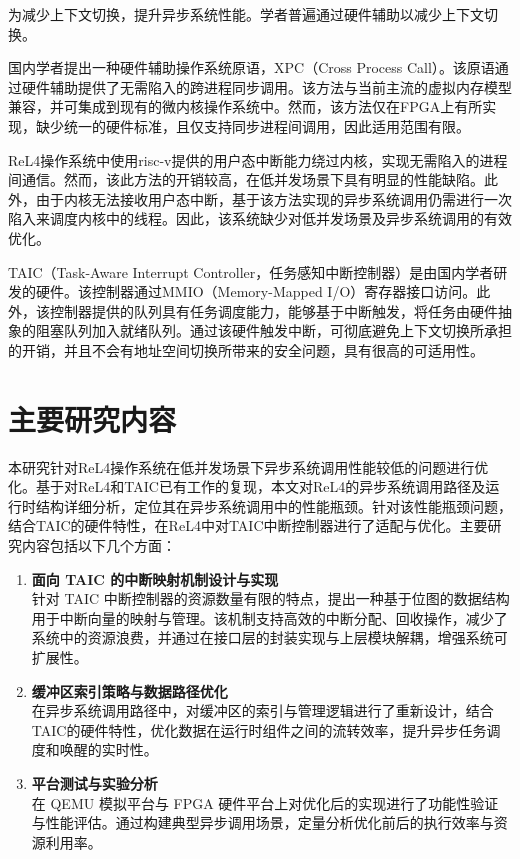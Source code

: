为减少上下文切换，提升异步系统性能。学者普遍通过硬件辅助以减少上下文切换。

国内学者提出一种硬件辅助操作系统原语，XPC（Cross Process Call）\cite{XPC2019}。该原语通过硬件辅助提供了无需陷入的跨进程同步调用。该方法与当前主流的虚拟内存模型兼容，并可集成到现有的微内核操作系统中。然而，该方法仅在FPGA上有所实现，缺少统一的硬件标准，且仅支持同步进程间调用，因此适用范围有限。

ReL4操作系统中使用risc-v提供的用户态中断能力绕过内核，实现无需陷入的进程间通信。然而，该此方法的开销较高，在低并发场景下具有明显的性能缺陷。此外，由于内核无法接收用户态中断，基于该方法实现的异步系统调用仍需进行一次陷入来调度内核中的线程。因此，该系统缺少对低并发场景及异步系统调用的有效优化。

TAIC（Task-Aware Interrupt Controller，任务感知中断控制器）\cite{taic2024}是由国内学者研发的硬件。该控制器通过MMIO（Memory-Mapped I/O）寄存器接口访问。此外，该控制器提供的队列具有任务调度能力，能够基于中断触发，将任务由硬件抽象的阻塞队列加入就绪队列。通过该硬件触发中断，可彻底避免上下文切换所承担的开销，并且不会有地址空间切换所带来的安全问题，具有很高的可适用性。

\section{主要研究内容}

本研究针对ReL4操作系统在低并发场景下异步系统调用性能较低的问题进行优化。基于对ReL4和TAIC已有工作的复现，本文对ReL4的异步系统调用路径及运行时结构详细分析，定位其在异步系统调用中的性能瓶颈。针对该性能瓶颈问题，结合TAIC的硬件特性，在ReL4中对TAIC中断控制器进行了适配与优化。主要研究内容包括以下几个方面：

\begin{enumerate}

  \item \textbf{面向 TAIC 的中断映射机制设计与实现} \\
  针对 TAIC 中断控制器的资源数量有限的特点，提出一种基于位图的数据结构用于中断向量的映射与管理。该机制支持高效的中断分配、回收操作，减少了系统中的资源浪费，并通过在接口层的封装实现与上层模块解耦，增强系统可扩展性。

  \item \textbf{缓冲区索引策略与数据路径优化} \\
  在异步系统调用路径中，对缓冲区的索引与管理逻辑进行了重新设计，结合TAIC的硬件特性，优化数据在运行时组件之间的流转效率，提升异步任务调度和唤醒的实时性。

  \item \textbf{平台测试与实验分析} \\
  在 QEMU 模拟平台与 FPGA 硬件平台上对优化后的实现进行了功能性验证与性能评估。通过构建典型异步调用场景，定量分析优化前后的执行效率与资源利用率。


\end{enumerate}


